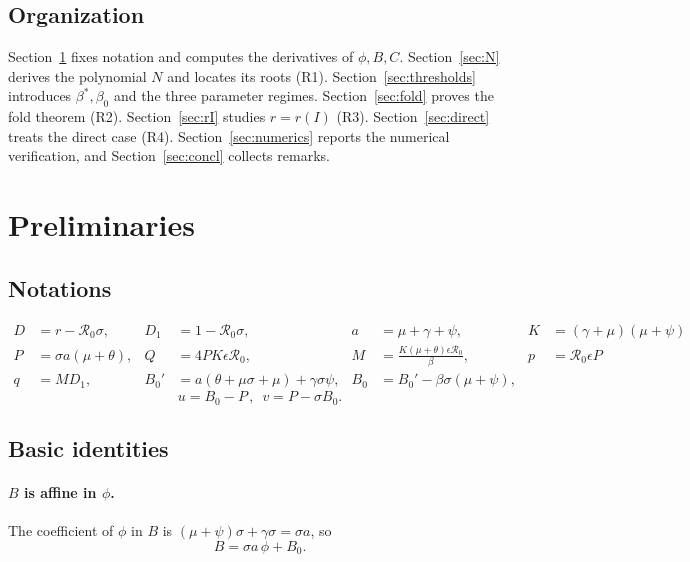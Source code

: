\documentclass[11pt]{article}
\theoremstyle{remark}
\newcommand{\R}{\mathcal R_0}
\begin{document}
\color{black}

\newpage

\subsection{Organization}

Section~\ref{sec:prelim} fixes notation and computes the derivatives of $\phi,B,C$. Section~\ref{sec:N} derives the polynomial $N$ and locates its roots (R1). Section~\ref{sec:thresholds} introduces $\beta^*,\beta_0$ and the three parameter regimes. Section~\ref{sec:fold} proves the fold theorem (R2). Section~\ref{sec:rI} studies $r=r(I)$ (R3). Section~\ref{sec:direct} treats the direct case (R4). Section~\ref{sec:numerics} reports the numerical verification, and Section~\ref{sec:concl} collects remarks.

\section{Preliminaries}\label{sec:prelim}

\subsection{Notations}

\begin{align*}
D &= r-\R\sigma, & D_1 &= 1-\R\sigma, & a &= \mu+\gamma+\psi, & K &= (\gamma+\mu)(\mu+\psi)\\
P &= \sigma a(\mu+\theta), & Q &= 4PK\epsilon\R, & M &= \frac{K(\mu+\theta)\epsilon\R}{\beta}, & p &= \R\epsilon P\\
q &= M D_1, & B_0' &= a(\theta+\mu\sigma+\mu)+\gamma\sigma\psi, & B_0 &= B_0'-\beta\sigma(\mu+\psi), & &
\end{align*}
$$ u=B_0-P\,,\,\,\, v=P-\sigma B_0 .$$

\subsection{Basic identities}

\paragraph{$B$ is affine in $\phi$.} The coefficient of $\phi$ in $B$ is $(\mu+\psi)\sigma+\gamma\sigma=\sigma a$, so
\begin{equation}
B=\sigma a\,\phi+B_0 .
\label{eq:B}
\end{equation}
\end{document}
